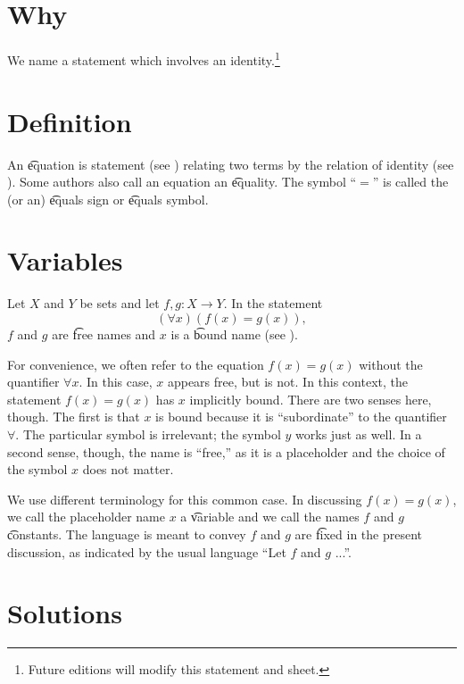 

\section*{Why}

We name a statement which involves an identity.\footnote{Future editions will modify this statement and sheet.}

\section*{Definition}

An \t{equation} is statement (see ) relating two terms by the relation of identity (see ).
Some authors also call an equation an \t{equality}.
The symbol ``$=$'' is called the (or an) \t{equals sign} or \t{equals symbol}.

\section*{Variables}

Let $X$ and $Y$ be sets and let $f,g: X \to Y$.
In the statement
\[
(\forall x)(f(x) = g(x)),
\]
$f$ and $g$ are \t{free} names and $x$ is a \t{bound} name (see ).

For convenience, we often refer to the equation $f(x) = g(x)$ without the quantifier $\forall x$.
In this case, $x$ appears free, but is not.
In this context, the statement $f(x) = g(x)$ has $x$ implicitly bound.
There are two senses here, though.
The first is that $x$ is bound because it is ``subordinate'' to the quantifier $\forall$.
The particular symbol is irrelevant; the symbol $y$ works just as well.
In a second sense, though, the name is ``free,'' as it is a placeholder and the choice of the symbol $x$ does not matter.

We use different terminology for this common case.
In discussing $f(x) = g(x)$, we call the placeholder name $x$ a \t{variable} and we call the names $f$ and $g$ \t{constants}.
The language is meant to convey $f$ and $g$ are \t{fixed} in the present discussion, as indicated by the usual language ``Let $f$ and $g$ ...''.

\section*{Solutions}

